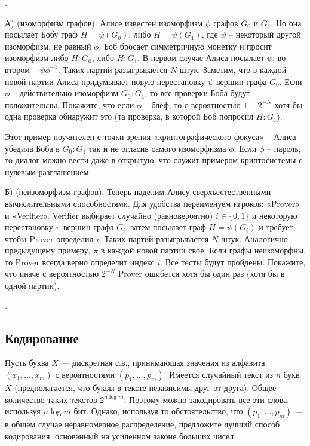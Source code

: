 \begin{problem}. 

А) (изоморфизм графов). Алисе известен изоморфизм $\phi$ графов $G_0$ и $G_1$. Но она посылает Бобу граф $H =\psi(G_0)$, либо $H =\psi(G_1)$, где $\psi$ – некоторый другой изоморфизм, не равный $\phi$. Боб бросает симметричную монетку и просит изоморфизм либо $H : G_0$, либо $H : G_1$. В первом случае Алиса посылает  $\psi$, во втором – $\psi \phi^{-1}$. Таких партий разыгрывается $N$ штук. Заметим, что в каждой новой партии Алиса придумывает новую перестановку $\psi$   вершин графа $G_0$. Если $\phi$  – действительно изоморфизм $G_0 : G_1$, то все проверки Боба будут положительны.
Покажите, что если $\phi$ – блеф, то с вероятностью  $1 - 2^{-N}$  хотя бы одна проверка обнаружит это (та проверка, в которой Боб попросил $H : G_1$).

\begin{remark}
Этот пример поучителен с точки зрения «криптографического фокуса» – Алиса убедила Боба в $G_0 : G_1$ так и не огласив самого изоморфизма $\phi$. Если $\phi$ – пароль, то диалог можно вести даже в открытую, что служит примером криптосистемы с нулевым разглашением.
\end{remark}

Б) (неизоморфизм графов). Теперь наделим Алису сверхъестественными вычислительными способностями. Для удобства переименуем игроков: «Prover» и «Verifier». Verifier выбирает случайно (равновероятно) $ i \in \lbrace 0, 1 \rbrace$ и некоторую перестановку $\pi$ вершин графа $G_i$, затем посылает граф $H =\psi(G_i)$ и требует, чтобы Prover определил $i$. Таких партий разыгрывается $N$ штук. Аналогично предыдущему примеру, $\pi$ в каждой новой партии свое. Если графы неизоморфны, то Prover всегда верно определит индекс $i$. Все тесты будут пройдены. Покажите, что иначе с вероятностью $2^{-N}$  Prover ошибется хотя бы один раз (хотя бы в одной партии).
 
\end{problem}

\begin{problem}.
\end{problem}

\subsection{Кодирование}

\begin{problem}
Пусть буква $X$ --- дискретная с.в., принимающая значения из алфавита $(x_1,\ldots,x_m)$ с вероятностями $(p_1,\ldots,p_m)$. 
Имеется случайный текст из $n$ букв $X$ (предполагается, что буквы в тексте независимы друг от друга). Общее количество таких 
текстов $2^{n\log m}$. Поэтому можно закодировать все эти слова, используя $n\log m$ бит. Однако, используя то обстоятельство, что 
$(p_1,\ldots,p_m)$ --- в общем случае неравномерное распределение, предложите лучший способ кодирования, основанный 
на усиленном законе больших чисел.
\end{problem}


